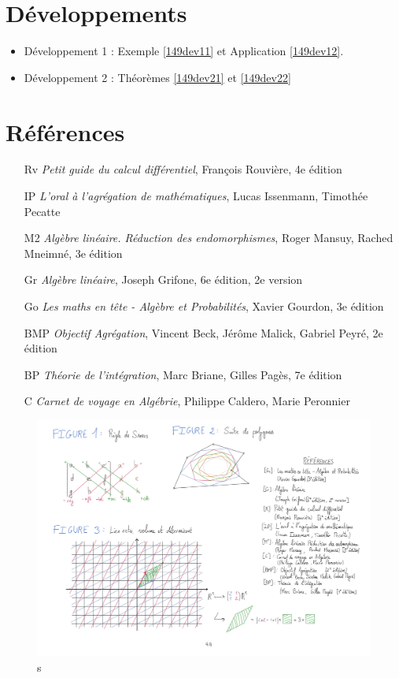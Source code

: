 \documentclass[10pt, a4paper, parskip=full, twoside, twocolumn]{report}
\begin{document}
\section*{Développements}
\begin{itemize}
	\item Développement 1 : Exemple \ref{149dev11} et Application \ref{149dev12}.
	\item Développement 2 : Théorèmes \ref{149dev21} et \ref{149dev22}
\end{itemize}

\section*{Références}
\begin{itemize}
	\item[Rv] \emph{Petit guide du calcul différentiel}, François Rouvière, 4e édition
	\item[IP] \emph{L'oral à l'agrégation de mathématiques}, Lucas Issenmann, Timothée Pecatte
	\item[M2] \emph{Algèbre linéaire. Réduction des endomorphismes}, Roger Mansuy, Rached Mneimné, 3e édition
	\item[Gr] \emph{Algèbre linéaire}, Joseph Grifone, 6e édition, 2e version
	\item[Go] \emph{Les maths en tête - Algèbre et Probabilités}, Xavier Gourdon, 3e édition  
	\item[BMP] \emph{Objectif Agrégation}, Vincent Beck, Jérôme Malick, Gabriel Peyré, 2e édition
	\item[BP] \emph{Théorie de l'intégration}, Marc Briane, Gilles Pagès, 7e édition
	\item[C] \emph{Carnet de voyage en Algébrie}, Philippe Caldero, Marie Peronnier
\end{itemize}

\begin{figure}[!htb]
	\centering
	\includegraphics[trim={0 0 0 0},clip,width=1\linewidth]{img/149.pdf}
	\caption{s}
\end{figure}
\end{document}
